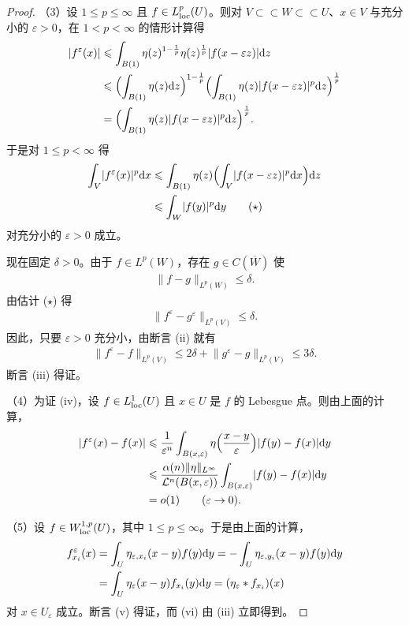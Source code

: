 \documentclass[../../main.tex]{subfiles}%
\begin{document}
\begin{proof}
（3）设 $1\leqslant p\leqslant\infty$ 且 $f\in L^p_{\mathrm{loc}}(U)$。则对 $V\subset\subset W\subset\subset U$、$x\in V$ 与充分小的 $\varepsilon>0$，在 $1<p<\infty$ 的情形计算得
\begin{align*}
\lvert f^\varepsilon(x)\rvert
&\leqslant\int_{B(1)}\eta(z)^{1-\frac1p}\eta(z)^{\frac1p}\lvert f(x-\varepsilon z)\rvert\mathrm{d} z\\
&\leqslant\Bigl(\int_{B(1)}\eta(z)\mathrm{d} z\Bigr)^{1-\frac1p}\Bigl(\int_{B(1)}\eta(z)\lvert f(x-\varepsilon z)\rvert^p\mathrm{d} z\Bigr)^{\frac1p}\\
&=\Bigl(\int_{B(1)}\eta(z)\lvert f(x-\varepsilon z)\rvert^p\mathrm{d} z\Bigr)^{\frac1p}.
\end{align*}
于是对 $1\leqslant p<\infty$ 得
\begin{align*}
\int_V\lvert f^\varepsilon(x)\rvert^p\mathrm{d} x
&\leqslant\int_{B(1)}\eta(z)\Bigl(\int_V\lvert f(x-\varepsilon z)\rvert^p\mathrm{d} x\Bigr)\mathrm{d} z\\
&\leqslant\int_W\lvert f(y)\rvert^p\mathrm{d} y\qquad(\star)
\end{align*}
对充分小的 $\varepsilon>0$ 成立。

现在固定 $\delta>0$。由于 $f\in L^p(W)$，存在 $g\in C(\overline{W})$ 使
\begin{align*}
\lVert f-g\rVert_{L^p(W)}\leqslant\delta.
\end{align*}
由估计 ($\star$) 得
\begin{align*}
\lVert f^\varepsilon-g^\varepsilon\rVert_{L^p(V)}\leqslant\delta.
\end{align*}
因此，只要 $\varepsilon>0$ 充分小，由断言 (ii) 就有
\begin{align*}
\lVert f^\varepsilon-f\rVert_{L^p(V)}\leqslant2\delta+\lVert g^\varepsilon-g\rVert_{L^p(V)}\leqslant3\delta.
\end{align*}
断言 (iii) 得证。

（4）为证 (iv)，设 $f\in L^1_{\mathrm{loc}}(U)$ 且 $x\in U$ 是 $f$ 的 Lebesgue 点。则由上面的计算，
\begin{align*}
\lvert f^\varepsilon(x)-f(x)\rvert
&\leqslant\frac{1}{\varepsilon^n}\int_{B(x,\varepsilon)}\eta\Bigl(\frac{x-y}{\varepsilon}\Bigr)\lvert f(y)-f(x)\rvert\mathrm{d} y\\
&\leqslant\frac{\alpha(n)\lVert\eta\rVert_{L^\infty}}{\mathcal{L}^n(B(x,\varepsilon))}\int_{B(x,\varepsilon)}\lvert f(y)-f(x)\rvert\mathrm{d} y\\
&=o(1)\qquad(\varepsilon\to0).
\end{align*}

（5）设 $f\in W^{1,p}_{\mathrm{loc}}(U)$，其中 $1\leqslant p\leqslant\infty$。于是由上面的计算，
\begin{align*}
f^\varepsilon_{x_i}(x)&=\int_U\eta_{\varepsilon,x_i}(x-y)f(y)\mathrm{d} y=-\int_U\eta_{\varepsilon,y_i}(x-y)f(y)\mathrm{d} y\\
&=\int_U\eta_\varepsilon(x-y)f_{x_i}(y)\mathrm{d} y=(\eta_\varepsilon*f_{x_i})(x)
\end{align*}
对 $x\in U_\varepsilon$ 成立。断言 (v) 得证，而 (vi) 由 (iii) 立即得到。
\end{proof}
\end{document}
